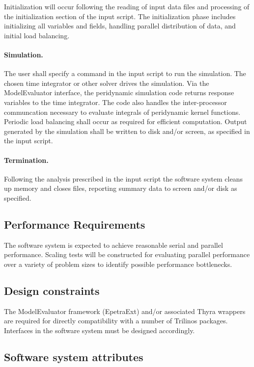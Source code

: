 \documentclass[10pt]{article}
\theoremstyle{plain}
\theoremstyle{definition}
\begin{document}
Initialization will occur following the reading of input data files and processing of the initialization section of the input script.  The initialization phase includes initializing all variables and fields, handling parallel distribution of data, and initial load balancing.

\paragraph{Simulation.}

The user shall specify a command in the input script to run the simulation. The chosen time integrator or other solver drives the simulation. Via the ModelEvaluator interface, the peridynamic simulation code returns response variables to the time integrator. The code also handles the inter-processor communcation necessary to evaluate integrals of peridynamic kernel functions. Periodic load balancing shall occur as required for efficient computation. Output generated by the simulation shall be written to disk and/or screen, as specified in the input script.

\paragraph{Termination.}

Following the analysis prescribed in the input script the software system cleans up memory and closes files, reporting summary data to screen and/or disk as specified.

\subsection{Performance Requirements}

The software system is expected to achieve reasonable serial and parallel performance.  Scaling tests will be constructed for evaluating parallel performance over a variety of problem sizes to identify possible performance bottlenecks.

\subsection{Design constraints}

The ModelEvaluator framework (EpetraExt) and/or associated Thyra wrappers are required for directly compatibility with a number of Trilinos packages.  Interfaces in the software system must be designed accordingly.

\subsection{Software system attributes}
\end{document}
